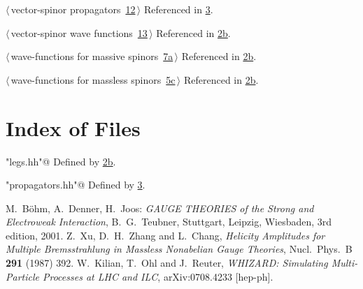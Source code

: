 \documentclass[a4paper,12pt]{amsart}
\renewcommand{\NWlink}[2]{\hyperlink{#1}{#2}}
\renewcommand{\NWtxtDefBy}{Defined by}
\renewcommand{\NWtxtRefIn}{Referenced in}
\begin{document}
{\begin{list}{}{\setlength{\itemsep}{-\parsep}\setlength{\itemindent}{-\leftmargin}}
\item $\langle\,$vector-spinor propagators\nobreak\ {\footnotesize \NWlink{nuweb12}{12}}$\,\rangle$ {\footnotesize {\NWtxtRefIn} \NWlink{nuweb3}{3}.}
\item $\langle\,$vector-spinor wave functions\nobreak\ {\footnotesize \NWlink{nuweb13}{13}}$\,\rangle$ {\footnotesize {\NWtxtRefIn} \NWlink{nuweb2b}{2b}.}
\item $\langle\,$wave-functions for massive spinors\nobreak\ {\footnotesize \NWlink{nuweb7a}{7a}}$\,\rangle$ {\footnotesize {\NWtxtRefIn} \NWlink{nuweb2b}{2b}.}
\item $\langle\,$wave-functions for massless spinors\nobreak\ {\footnotesize \NWlink{nuweb5c}{5c}}$\,\rangle$ {\footnotesize {\NWtxtRefIn} \NWlink{nuweb2b}{2b}.}
\end{list}}

\section{Index of Files}

{\small\begin{list}{}{\setlength{\itemsep}{-\parsep}\setlength{\itemindent}{-\leftmargin}}
\item \verb@"legs.hh"@ {\footnotesize {\NWtxtDefBy} \NWlink{nuweb2b}{2b}.}
\item \verb@"propagators.hh"@ {\footnotesize {\NWtxtDefBy} \NWlink{nuweb3}{3}.}
\end{list}}

\begin{thebibliography}{[8]}
M.~B\"ohm, A.~Denner, H.~Joos: \textit{GAUGE THEORIES
of the Strong and Electroweak Interaction}, B.~G.~Teubner, Stuttgart,
Leipzig, Wiesbaden, 3rd edition, 2001.
  Z.~Xu, D.~H.~Zhang and L.~Chang,
  \textit{Helicity Amplitudes for Multiple Bremsstrahlung
  in Massless Nonabelian Gauge Theories},
  Nucl.\ Phys.\  B {\bf 291} (1987) 392.
  W.~Kilian, T.~Ohl and J.~Reuter,
  \textit{WHIZARD: Simulating Multi-Particle Processes at LHC and ILC},
  arXiv:0708.4233 [hep-ph].
\end{thebibliography}
\end{document}
